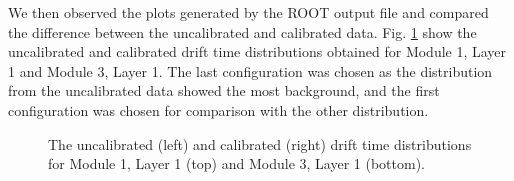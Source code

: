 \documentclass[a4paper]{report}
\numberwithin{equation}{section}
\begin{document}
We then observed the plots generated by the ROOT output file and compared the difference between the uncalibrated and 
calibrated data. Fig. \ref{fig:calib_drift_layer} show the uncalibrated and calibrated drift time distributions obtained for Module 1, Layer 1 and 
Module 3, Layer 1. The last configuration was chosen as the distribution from the uncalibrated data showed the most background, and the first 
configuration was chosen for comparison with the other distribution. \par

\begin{figure}[htb!]
	\centering
	\quad
	\centering
	\quad
	\centering
	\quad
	\centering
	\caption{The uncalibrated (left) and calibrated (right) drift time 
	distributions for Module 1, Layer 1 (top) and Module 3, Layer 1 (bottom).}
	\label{fig:calib_drift_layer}
\end{figure}
\end{document}
